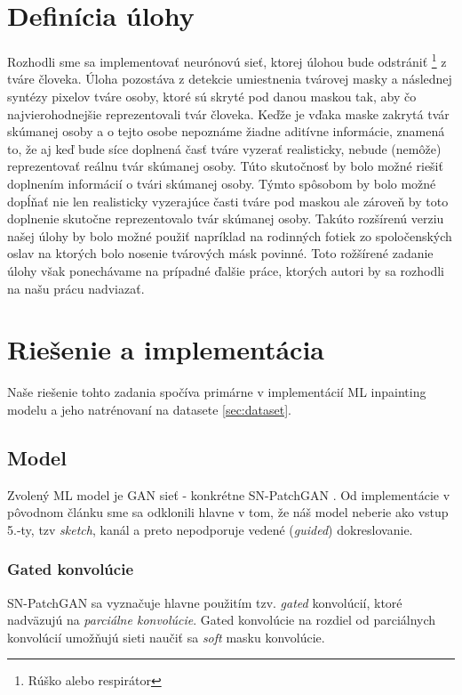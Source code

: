 \documentclass [11pt, a4paper]{article}
\begin{document}
	\section{Definícia úlohy}
		Rozhodli sme sa implementovať neurónovú sieť, ktorej úlohou bude odstrániť \footnote{Rúško alebo respirátor} z tváre človeka. Úloha pozostáva z detekcie umiestnenia tvárovej masky a 	následnej syntézy pixelov tváre osoby, ktoré sú skryté pod danou maskou tak, aby čo najvierohodnejšie reprezentovali tvár človeka. Keďže je vďaka maske zakrytá tvár skúmanej osoby a o tejto osobe nepoznáme žiadne aditívne informácie, znamená to, že aj keď bude síce doplnená časť tváre vyzerať realisticky, nebude (nemôže) reprezentovať reálnu tvár skúmanej osoby. Túto skutočnosť by bolo možné riešiť doplnením informácií o tvári skúmanej osoby. Týmto spôsobom by bolo možné dopĺňať nie len realisticky vyzerajúce časti tváre pod maskou ale zároveň by toto doplnenie skutočne reprezentovalo tvár skúmanej osoby. Takúto rozšírenú verziu našej úlohy by bolo možné použiť napríklad na  rodinných fotiek zo spoločenských oslav na ktorých bolo nosenie tvárových másk povinné. Toto rožšírené zadanie úlohy však ponechávame na prípadné ďalšie práce, ktorých autori by sa rozhodli na našu prácu nadviazať.
	
	\section{Riešenie a implementácia}
		Naše riešenie tohto zadania spočíva primárne v implementácií ML inpainting modelu a jeho natrénovaní na datasete \ref{sec:dataset}.
		
		\subsection{Model}
			Zvolený ML model je GAN sieť - konkrétne SN-PatchGAN \cite{yu2018free}. Od implementácie v pôvodnom článku sme sa odklonili hlavne v tom, že náš model neberie ako vstup 5.-ty, tzv \textit{sketch}, kanál a preto nepodporuje vedené (\textit{guided}) dokreslovanie.
			
			\subsubsection{Gated konvolúcie}\label{sec:gated_conv}
				SN-PatchGAN sa vyznačuje hlavne použitím tzv. \textit{gated} konvolúcií, ktoré nadväzujú na \textit{parciálne konvolúcie}\cite{liu2018image}. Gated konvolúcie na rozdiel od parciálnych konvolúcií umožňujú sieti naučiť sa \textit{soft} masku konvolúcie.
				
\end{document}

